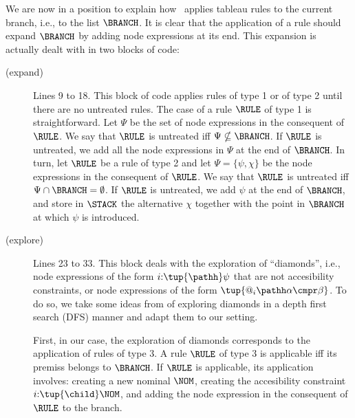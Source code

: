 We are now in a position to explain how~ applies tableau rules to the current branch, i.e., to the list $\BRANCH$.
It is clear that the application of a rule should expand $\BRANCH$ by adding node expressions at its end.
This expansion is actually dealt with in two blocks of code:
\begin{description}
    \item[(expand)]
        Lines 9 to 18.
        This block of code applies rules of type 1 or of type 2 until there are no untreated rules.
        The case of a rule $\RULE$ of type 1 is straightforward.
        Let $\Psi$ be the set of node expressions in the consequent of $\RULE$.
        We say that $\RULE$ is untreated iff $\Psi \nsubseteq \BRANCH$.
        If $\RULE$ is untreated, we add all the node expressions in $\Psi$ at the end of $\BRANCH$. 
        In turn, let $\RULE$ be a rule of type 2 and let $\Psi = \{\psi,\chi\}$ be the node expressions in the consequent of $\RULE$. 
        We say that $\RULE$ is untreated iff $\Psi \cap \BRANCH = \emptyset$.
        If $\RULE$ is untreated, we add $\psi$ at the end of $\BRANCH$, and store in $\STACK$ the alternative $\chi$ together with the point in $\BRANCH$ at which $\psi$ is introduced.

    \item[(explore)]
        Lines 23 to 33.
        This block deals with the exploration of ``diamonds'', i.e., node expressions of the form $i{:}\tup{\pathh}\psi$ that are not accesibility constraints, or node expressions of the form $\tup{@_i\pathh\alpha \cmpr \beta}$. 
        To do so, we take some ideas from \cite{Ladner77,Marx06} of exploring diamonds in a depth first search (DFS) manner and adapt them to our setting.
        
        First, in our case, the exploration of diamonds corresponds to the application of rules of type 3.
        A rule $\RULE$ of type 3 is applicable iff its premiss belongs to $\BRANCH$.
        If $\RULE$ is applicable, its application involves: creating a new nominal $\NOM$, creating the accesibility constraint $i{:}\tup{\child}\NOM$, and adding the node expression in the consequent of $\RULE$ to the branch.


\end{description}
